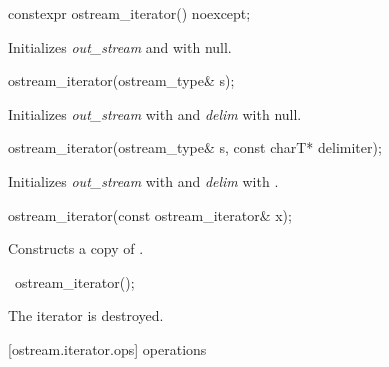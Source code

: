 \begin{addedblock}
%
\begin{itemdecl}
constexpr ostream_iterator() noexcept;
\end{itemdecl}

\begin{itemdescr}
\pnum
\effects
Initializes \textit{out_stream} and  with null.
\end{itemdescr}
\end{addedblock}

%
\begin{itemdecl}
ostream_iterator(ostream_type& s);
\end{itemdecl}

\begin{itemdescr}
\pnum
\effects
Initializes \textit{out_stream} with  and \textit{delim} with null.
\end{itemdescr}


%
\begin{itemdecl}
ostream_iterator(ostream_type& s, const charT* delimiter);
\end{itemdecl}

\begin{itemdescr}
\pnum
\effects
Initializes \textit{out_stream} with  and \textit{delim} with .
\end{itemdescr}


%
\begin{itemdecl}
ostream_iterator(const ostream_iterator& x);
\end{itemdecl}

\begin{itemdescr}
\pnum
\effects
Constructs a copy of .
\end{itemdescr}

%
\begin{itemdecl}
~ostream_iterator();
\end{itemdecl}

\begin{itemdescr}
\pnum
\effects
The iterator is destroyed.
\end{itemdescr}

[ostream.iterator.ops]{ operations}

